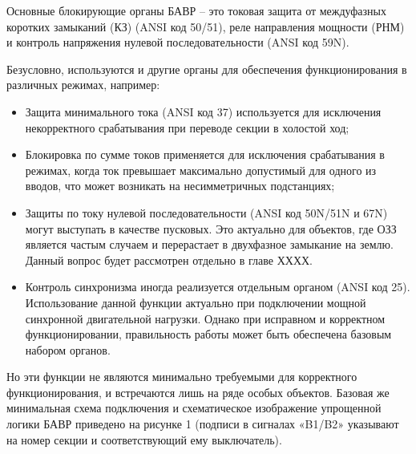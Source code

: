 Основные блокирующие органы БАВР – это токовая защита от междуфазных коротких замыканий (КЗ) (ANSI код 50/51), реле направления мощности (РНМ) и контроль напряжения нулевой последовательности (ANSI код 59N).\par\vspace{0.2cm}

Безусловно, используются и другие органы для обеспечения функционирования в различных режимах, например:\par\vspace{0.2cm}

\begin{itemize}
  \item Защита минимального тока (ANSI код 37) используется для исключения некорректного срабатывания при переводе секции в холостой ход;
  \item Блокировка по сумме токов применяется для исключения срабатывания в режимах, когда ток превышает максимально допустимый для одного из вводов, что может возникать на несимметричных подстанциях;
  \item Защиты по току нулевой последовательности (ANSI код 50N/51N и 67N) могут выступать в качестве пусковых. Это актуально для объектов, где ОЗЗ является частым случаем и перерастает в двухфазное замыкание на землю. Данный вопрос будет рассмотрен отдельно в главе ХХХХ.
  \item Контроль синхронизма иногда реализуется отдельным органом (ANSI код 25). Использование данной функции актуально при подключении мощной синхронной двигательной нагрузки. Однако при исправном и корректном функционировании, правильность работы может быть обеспечена базовым набором органов.
\end{itemize}

Но эти функции не являются минимально требуемыми для корректного функционирования, и встречаются лишь на ряде особых объектов. Базовая же минимальная схема подключения и схематическое изображение упрощенной логики БАВР приведено на рисунке 1 (подписи в сигналах «B1/B2» указывают на номер секции и соответствующий ему выключатель).\par\vspace{0.3cm}

